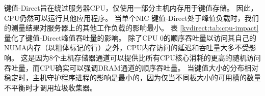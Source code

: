 键值-Direct旨在绕过服务器CPU，仅使用一部分主机内存用于键值存储。 因此，CPU仍然可以运行其他应用程序。
当单个NIC 键值-Direct处于峰值负载时，我们的测量结果对服务器上的其他工作负载的影响最小。
表 \ref {kvdirect:tab:cpu-impact} 量化了键值-Direct峰值吞吐量的影响。
除了CPU 0的顺序吞吐量以访问其自己的NUMA内存（以粗体标记的行）之外，CPU内存访问的延迟和吞吐量大多不受影响。
这是因为8个主机存储器通道可以提供比所有CPU核心消耗的更高的随机访问吞吐量，而CPU确实可以强调DRAM通道的顺序吞吐量。
当键值大小的分布相对稳定时，主机守护程序进程的影响是最小的，因为仅当不同板大小的可用槽的数量不平衡时才调用垃圾收集器。
